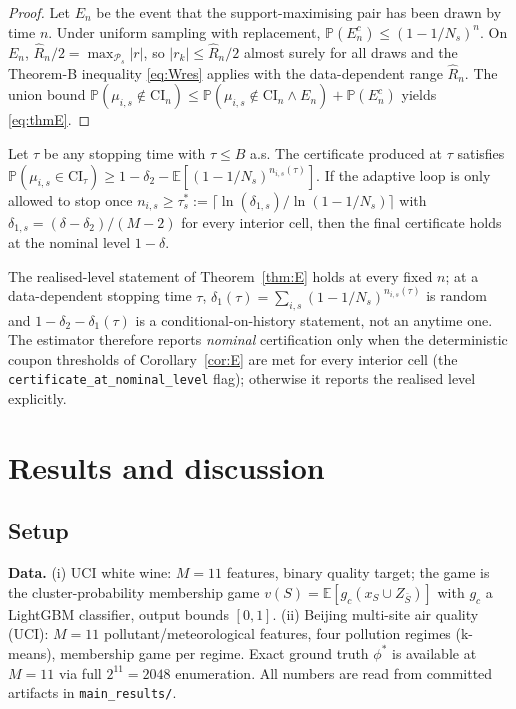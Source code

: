 \documentclass[preprint,12pt]{elsarticle}
\newcommand{\E}{\mathbb{E}}
\newcommand{\P}{\mathbb{P}}
\begin{document}
\begin{proof}
Let $E_n$ be the event that the support-maximising pair has been drawn by time $n$. Under uniform sampling with replacement, $\P(E_n^c)\le(1-1/N_s)^n$. On $E_n$, $\hat R_n/2=\max_{\mathcal P_s}|r|$, so $|r_k|\le\hat R_n/2$ almost surely for all draws and the Theorem-B inequality \eqref{eq:Wres} applies with the data-dependent range $\hat R_n$. The union bound $\P(\mu_{i,s}\notin\mathrm{CI}_n)\le\P(\mu_{i,s}\notin\mathrm{CI}_n\wedge E_n)+\P(E_n^c)$ yields \eqref{eq:thmE}.
\end{proof}

\begin{corollary}\label{cor:E}
Let $\tau$ be any stopping time with $\tau\le B$ a.s. The certificate produced at $\tau$ satisfies $\P(\mu_{i,s}\in\mathrm{CI}_\tau)\ge1-\delta_2-\E[(1-1/N_s)^{n_{i,s}(\tau)}]$. If the adaptive loop is only allowed to stop once $n_{i,s}\ge\tau_s^*:=\big\lceil\ln(\delta_{1,s})/\ln(1-1/N_s)\big\rceil$ with $\delta_{1,s}=(\delta-\delta_2)/(M-2)$ for every interior cell, then the final certificate holds at the nominal level $1-\delta$.
\end{corollary}

\begin{remark}\label{rem:stopping}
The realised-level statement of Theorem~\ref{thm:E} holds at every fixed $n$; at a data-dependent stopping time $\tau$, $\delta_1(\tau)=\sum_{i,s}(1-1/N_s)^{n_{i,s}(\tau)}$ is random and $1-\delta_2-\delta_1(\tau)$ is a conditional-on-history statement, not an anytime one. The estimator therefore reports \emph{nominal} certification only when the deterministic coupon thresholds of Corollary~\ref{cor:E} are met for every interior cell (the \texttt{certificate\_at\_nominal\_level} flag); otherwise it reports the realised level explicitly.
\end{remark}

\section{Results and discussion}\label{sec:results}

\subsection{Setup}\label{sec:setup}

\textbf{Data.} (i) UCI white wine: $M=11$ features, binary quality target; the game is the cluster-probability membership game $v(S)=\E[g_c(x_S\cup Z_{\bar S})]$ with $g_c$ a LightGBM classifier, output bounds $[0,1]$. (ii) Beijing multi-site air quality (UCI): $M=11$ pollutant/meteorological features, four pollution regimes (k-means), membership game per regime. Exact ground truth $\phi^*$ is available at $M=11$ via full $2^{11}=2048$ enumeration. All numbers are read from committed artifacts in \texttt{main\_results/}.
\end{document}
